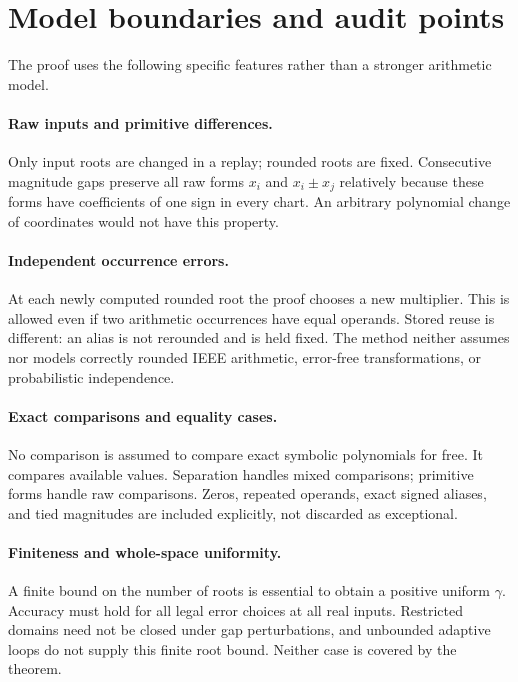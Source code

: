 \documentclass[11pt,a4paper]{article}
\theoremstyle{definition}
\theoremstyle{remark}
\begin{document}
\section{Model boundaries and audit points}

The proof uses the following specific features rather than a stronger
arithmetic model.

\paragraph{Raw inputs and primitive differences.}
Only input roots are changed in a replay; rounded roots are fixed. Consecutive
magnitude gaps preserve all raw forms $x_i$ and $x_i\pm x_j$ relatively because
these forms have coefficients of one sign in every chart. An arbitrary
polynomial change of coordinates would not have this property.

\paragraph{Independent occurrence errors.}
At each newly computed rounded root the proof chooses a new multiplier.
This is allowed even if two arithmetic occurrences have equal operands.
Stored reuse is different: an alias is not rerounded and is held fixed.
The method neither assumes nor models correctly rounded IEEE arithmetic,
error-free transformations, or probabilistic independence.

\paragraph{Exact comparisons and equality cases.}
No comparison is assumed to compare exact symbolic polynomials for free.
It compares available values. Separation handles mixed comparisons; primitive
forms handle raw comparisons. Zeros, repeated operands, exact signed aliases,
and tied magnitudes are included explicitly, not discarded as exceptional.

\paragraph{Finiteness and whole-space uniformity.}
A finite bound on the number of roots is essential to obtain a positive
uniform $\gamma$. Accuracy must hold for all legal error choices at all real
inputs. Restricted domains need not be closed under gap perturbations, and
unbounded adaptive loops do not supply this finite root bound. Neither case
is covered by the theorem.
\end{document}
